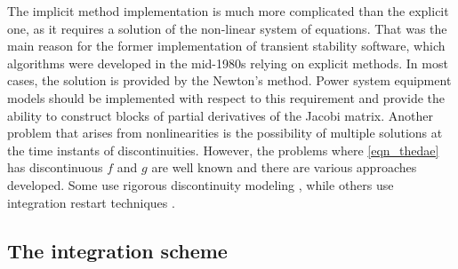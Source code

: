 \documentclass[lettersize,journal]{IEEEtran}
\begin{document}
The implicit method implementation is much more complicated than the explicit one, as it requires a solution of the non-linear system of equations. That was the main reason for the former implementation of transient stability software, which algorithms were developed in the mid-1980s relying on explicit methods. In most cases, the solution is provided by the Newton's method. Power system equipment models should be implemented with respect to this requirement and provide the ability to construct blocks of partial derivatives of the Jacobi matrix. Another problem that arises from nonlinearities is the possibility of multiple solutions at the time instants of discontinuities. However, the problems where \eqref{eqn_thedae} has discontinuous \(f\) and \(g\) are well known and there are various approaches developed. Some use rigorous discontinuity modeling \cite{Filippov1988}, while others use integration restart techniques \cite{cellier06}.

\subsection{The integration scheme}
\end{document}
